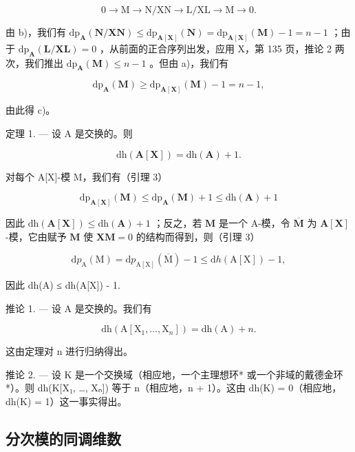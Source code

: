 \[
0 \rightarrow \mathrm{M} \rightarrow \mathrm{N} / \mathrm{XN} \rightarrow \mathrm{L} / \mathrm{XL} \rightarrow \mathrm{M} \rightarrow 0.
\]

由 b)，我们有 \(\mathrm{dp}_{\mathbf{A}}(\mathbf{N} / \mathbf{X}\mathbf{N}) \leqslant \mathrm{dp}_{\mathbf{A}[\mathbf{X}]}(\mathbf{N}) = \mathrm{dp}_{\mathbf{A}[\mathbf{X}]}(\mathbf{M}) - 1 = n - 1\) ；由于 \(\mathrm{dp}_{\mathbf{A}}(\mathbf{L} / \mathbf{XL}) = 0\) ，从前面的正合序列出发，应用 X，第 135 页，推论 2 两次，我们推出 \(\mathrm{dp}_{\mathbf{A}}(\mathbf{M}) \leqslant n - 1\) 。但由 a)，我们有

\[
\mathrm{dp} _ {\mathbf {A}} (\mathbf {M}) \geqslant \mathrm{dp} _ {\mathbf {A} [ \mathbf {X} ]} (\mathbf {M}) - 1 = n - 1,
\]

由此得 c)。

定理 1. --- 设 A 是交换的。则

\[
\mathrm{dh} (\mathbf {A} [ \mathbf {X} ]) = \mathrm{dh} (\mathbf {A}) + 1.
\]

对每个 A{[}X{]}-模 M，我们有（引理 3）

\[
\mathrm{dp} _ {\mathbf {A} [ \mathbf {X} ]} (\mathbf {M}) \leqslant \mathrm{dp} _ {\mathbf {A}} (\mathbf {M}) + 1 \leqslant \mathrm{dh} (\mathbf {A}) + 1
\]

因此 \(\mathrm{dh}(\mathbf{A}[\mathbf{X}]) \leqslant \mathrm{dh}(\mathbf{A}) + 1\) ；反之，若 \(\mathbf{M}\) 是一个 A-模，令 \(\overline{\mathbf{M}}\) 为 \(\mathbf{A}[\mathbf{X}]\) -模，它由赋予 \(\mathbf{M}\) 使 \(\mathbf{X}\mathbf{M} = 0\) 的结构而得到，则（引理 3）

\[
\mathrm{d} p _ {\mathrm{A}} (\mathrm{M}) = \mathrm{d} p _ {\mathrm{A} [ \mathrm{X} ]} (\overline {{\mathrm{M}}}) - 1 \leqslant \mathrm{d} h (\mathrm{A} [ \mathrm{X} ]) - 1,
\]

因此 dh(A) ≤ dh(A{[}X{]}) - 1.

推论 1. --- 设 A 是交换的。我们有

\[
\mathrm{dh} (\mathrm{A} [ \mathrm{X} _ {1}, \dots , \mathrm{X} _ {n} ]) = \mathrm{dh} (\mathrm{A}) + n.
\]

这由定理对 n 进行归纳得出。

推论 2. --- 设 K 是一个交换域（相应地，一个主理想环* 或一个非域的戴德金环*）。则 dh(K{[}X₁, \ldots, Xₙ{]}) 等于 n（相应地，n + 1）。这由 dh(K) = 0（相应地，dh(K) = 1）这一事实得出。

\subsection{分次模的同调维数}

